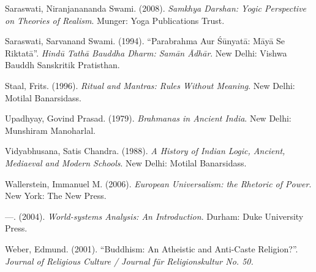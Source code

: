 \begin{thebibliography}{99}
  Saraswati, Niranjanananda Swami. (2008). \textit{Samkhya Darshan: Yogic Perspective on Theories of Realism}. Munger: Yoga Publications Trust.

  Saraswati, Sarvanand Swami. (1994). “Parabrahma Aur Śūnyatā: Māyā Se Riktatā”. \textit{Hindū Tathā Bauddha Dharm: Samān Ādhār}. New Delhi: Vishwa Bauddh Sanskritik Pratisthan.

  Staal, Frits. (1996). \textit{Ritual and Mantras: Rules Without Meaning}. New Delhi: Motilal Banarsidass.

  Upadhyay, Govind Prasad. (1979). \textit{Brahmanas in Ancient India}. New Delhi: Munshiram Manoharlal.

  Vidyabhusana, Satis Chandra. (1988). \textit{A History of Indian Logic, Ancient, Mediaeval and Modern Schools}. New Delhi: Motilal Banarsidass.

  Wallerstein, Immanuel M. (2006). \textit{European Universalism: the Rhetoric of Power}. New York: The New Press.

  ---. (2004). \textit{World-systems Analysis: An Introduction}. Durham: Duke University Press.

  Weber, Edmund. (2001). “Buddhism: An Atheistic and Anti-Caste Religion?”. \textit{Journal of Religious Culture / Journal für Religionskultur No. 50.}

 \end{thebibliography}

\theendnotes

\label{chapter3-end}
